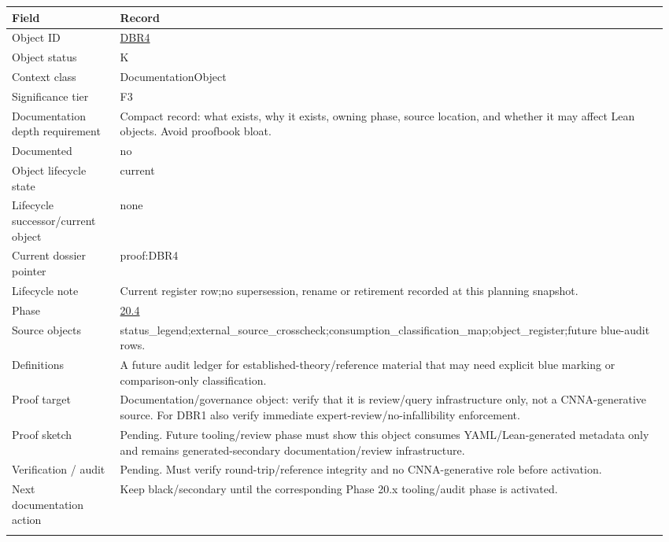 \begin{longtable}{L{0.16\linewidth} L{0.81\linewidth}}
\hline
\textbf{Field} & \textbf{Record}\\
\hline
Object ID & \hyperlink{object-row-DBR4}{DBR4}\\
\hline\addlinespace[0.20em]
Object status & K\\
\hline\addlinespace[0.20em]
Context class & DocumentationObject\\
\hline\addlinespace[0.20em]
Significance tier & F3\\
\hline\addlinespace[0.20em]
Documentation depth requirement & Compact record: what exists, why it exists, owning phase, source location, and whether it may affect Lean objects. Avoid proofbook bloat.\\
\hline\addlinespace[0.20em]
Documented & no\\
\hline\addlinespace[0.20em]
Object lifecycle state & current\\
\hline\addlinespace[0.20em]
Lifecycle successor/\allowbreak{}current object & none\\
\hline\addlinespace[0.20em]
Current dossier pointer & proof:DBR4\\
\hline\addlinespace[0.20em]
Lifecycle note & Current register row;\newline no supersession, rename or retirement recorded at this planning snapshot.\\
\hline\addlinespace[0.20em]
Phase & \hyperlink{phase-row-20-4}{20.4}\\
\hline\addlinespace[0.20em]
Source objects & status\_legend;\newline external\_source\_crosscheck;\newline consumption\_classification\_map;\newline object\_register;\newline future blue-audit rows.\\
\hline\addlinespace[0.20em]
Definitions & A future audit ledger for established-theory/\allowbreak{}reference material that may need explicit blue marking or comparison-only classification.\\
\hline\addlinespace[0.20em]
Proof target & Documentation/\allowbreak{}governance object: verify that it is review/\allowbreak{}query infrastructure only, not a CNNA-generative source. For DBR1 also verify immediate expert-review/\allowbreak{}no-infallibility enforcement.\\
\hline\addlinespace[0.20em]
Proof sketch & Pending. Future tooling/\allowbreak{}review phase must show this object consumes YAML/\allowbreak{}Lean-generated metadata only and remains generated-secondary documentation/\allowbreak{}review infrastructure.\\
\hline\addlinespace[0.20em]
Verification /\allowbreak{} audit & Pending. Must verify round-trip/\allowbreak{}reference integrity and no CNNA-generative role before activation.\\
\hline\addlinespace[0.20em]
Next documentation action & Keep black/\allowbreak{}secondary until the corresponding Phase 20.x tooling/\allowbreak{}audit phase is activated.\\
\hline\addlinespace[0.20em]
\end{longtable}
